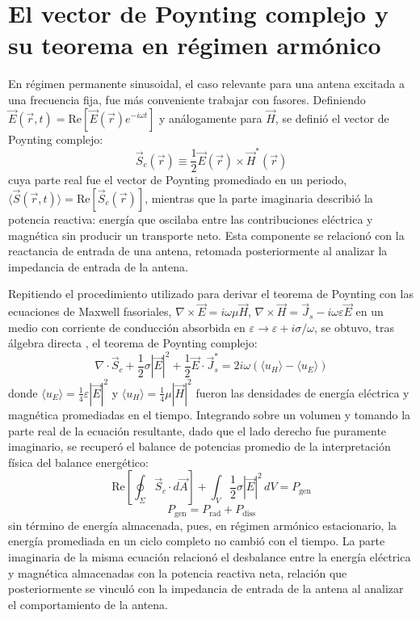 \section{El vector de Poynting complejo y su teorema en régimen armónico}
En régimen permanente sinusoidal, el caso relevante para una antena excitada a una frecuencia fija, fue más conveniente trabajar con fasores. Definiendo $\vec{E}(\vec{r}, t)=\text{Re}[\vec{E}(\vec{r})e^{-i\omega t}]$ y análogamente para $\vec{H}$, se definió el vector de Poynting complejo:
\begin{equation}
    \vec{S}_c(\vec{r}) \equiv \frac{1}{2}\vec{E}(\vec{r})\times\vec{H}^*(\vec{r})
\end{equation}
cuya parte real fue el vector de Poynting promediado en un periodo, $\langle\vec{S}(\vec{r}, t)\rangle = \text{Re}[\vec{S}_c(\vec{r})]$, mientras que la parte imaginaria describió la potencia reactiva: energía que oscilaba entre las contribuciones eléctrica y magnética sin producir un transporte neto. Esta componente se relacionó con la reactancia de entrada de una antena, retomada posteriormente al analizar la impedancia de entrada de la antena.

Repitiendo el procedimiento utilizado para derivar el teorema de Poynting con las ecuaciones de Maxwell fasoriales, $\nabla\times\vec{E}=i\omega\mu\vec{H}$, $\nabla\times\vec{H}=\vec{J}_s-i\omega\varepsilon\vec{E}$ en un medio con corriente de conducción absorbida en $\varepsilon\to\varepsilon+i\sigma/\omega$, se obtuvo, tras álgebra directa \cite{Balanis2016, Jackson1998}, el teorema de Poynting complejo:
\begin{equation}
    \nabla\cdot\vec{S}_c + \frac{1}{2}\sigma|\vec{E}|^2 + \frac{1}{2}\vec{E}\cdot\vec{J}_s^* = 2i\omega\left(\langle u_H\rangle - \langle u_E\rangle\right)
\end{equation}
donde $\langle u_E\rangle=\frac{1}{4}\varepsilon|\vec{E}|^2$ y $\langle u_H\rangle=\frac{1}{4}\mu|\vec{H}|^2$ fueron las densidades de energía eléctrica y magnética promediadas en el tiempo. Integrando sobre un volumen y tomando la parte real de la ecuación resultante, dado que el lado derecho fue puramente imaginario, se recuperó el balance de potencias promedio de la interpretación física del balance energético:
\begin{equation}
    \text{Re}\left[\oint_\Sigma \vec{S}_c\cdot d\vec{A}\right] + \int_V\frac{1}{2}\sigma|\vec{E}|^2\, dV = P_{\text{gen}}
\end{equation}
\begin{equation}
    P_{\text{gen}} = P_{\text{rad}} + P_{\text{diss}}
\end{equation}
sin término de energía almacenada, pues, en régimen armónico estacionario, la energía promediada en un ciclo completo no cambió con el tiempo. La parte imaginaria de la misma ecuación relacionó el desbalance entre la energía eléctrica y magnética almacenadas con la potencia reactiva neta, relación que posteriormente se vinculó con la impedancia de entrada de la antena al analizar el comportamiento de la antena.

